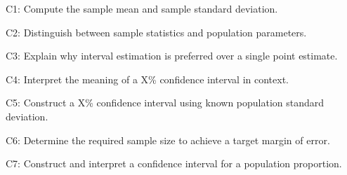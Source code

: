 

	
	\begin{ExamCriteria}
		\item C1: Compute the sample mean and sample standard deviation.
		\item C2: Distinguish between sample statistics and population parameters.
		\item C3: Explain why interval estimation is preferred over a single point estimate.
		\item C4: Interpret the meaning of a X\% confidence interval in context.
		\item C5: Construct a X\% confidence interval using known population standard deviation.
		\item C6: Determine the required sample size to achieve a target margin of error.
		\item C7: Construct and interpret a confidence interval for a population proportion.
	\end{ExamCriteria}

